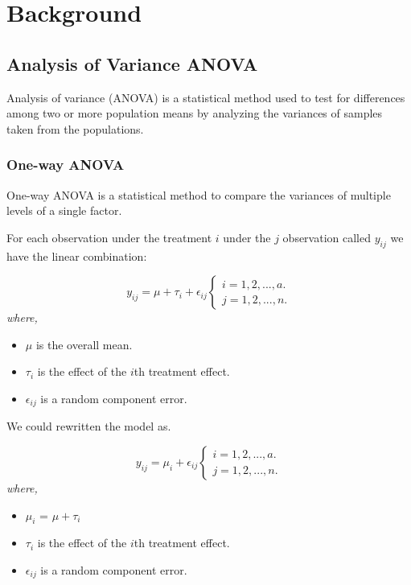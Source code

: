 %
%
\section{Background}
\subsection{Analysis of Variance ANOVA}
Analysis of variance (ANOVA) is a statistical method used to test for differences among two or more population means by analyzing the variances of samples taken from the populations.

\subsubsection{One-way ANOVA}
One-way ANOVA is a statistical method to compare the variances of multiple levels of a single factor.

For each observation under the treatment $i$ under the $j$ observation called $y_{ij}$ we have the linear combination:

\[y_{ij} = \mu + \tau_i + \epsilon_{ij} 
\begin{cases}
    i = 1,2,...,a.\\
    j = 1,2,...,n.
\end{cases}
\]
\textit{where,}
\begin{itemize}
    \item $\mu$ is the overall mean.
    \item $\tau_i$ is the effect of the $i$th treatment effect.
    \item $\epsilon_{ij}$ is a random component error.
\end{itemize}
We could rewritten the model as.

\[y_{ij} = \mu_i + \epsilon_{ij} 
\begin{cases}
    i = 1,2,...,a.\\
    j = 1,2,...,n.
\end{cases}
\]
\textit{where,}
\begin{itemize}
    \item $\mu_i$ =  $\mu + \tau_i$
    \item $\tau_i$ is the effect of the $i$th treatment effect.
    \item $\epsilon_{ij}$ is a random component error.
\end{itemize}

